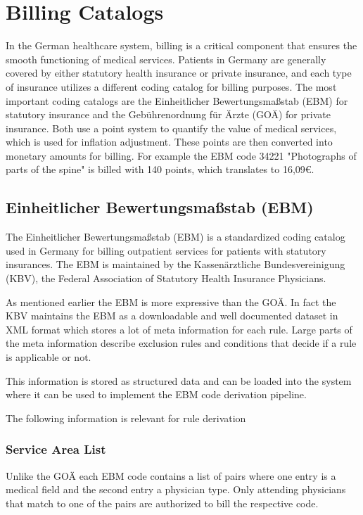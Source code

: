 \section{Billing Catalogs}
In the German healthcare system, billing is a critical component that ensures the smooth functioning of medical services.
Patients in Germany are generally covered by either statutory health insurance or private insurance, and each type of insurance
utilizes a different coding catalog for billing purposes.
The most important coding catalogs are the Einheitlicher Bewertungsmaßstab (EBM) for statutory insurance and the Gebührenordnung für Ärzte (GOÄ) for private insurance.
Both use a point system to quantify the value of medical services, which is used for inflation adjustment.
These points are then converted into monetary amounts for billing.
For example the EBM code 34221 "Photographs of parts of the spine" is billed with 140 points, which translates to 16,09€.



\subsection{Einheitlicher Bewertungsmaßstab (EBM)}
The Einheitlicher Bewertungsmaßstab (EBM) is a standardized coding catalog used in Germany for billing outpatient services for patients with statutory insurances.
The EBM is maintained by the Kassenärztliche Bundesvereinigung (KBV), the Federal Association of Statutory Health Insurance Physicians\cite[]{hermanns2015ebm}.

As mentioned earlier the EBM is more expressive than the GOÄ.
In fact the KBV maintains the EBM as a downloadable and well documented dataset in XML format which stores a lot of meta information for each rule.
Large parts of the meta information describe exclusion rules and conditions that decide if a rule is applicable or not.

This information is stored as structured data and can be loaded into the system where it can be used to implement the EBM code derivation pipeline.

The following information is relevant for rule derivation
\subsubsection{Service Area List}
Unlike the GOÄ each EBM code contains a list of pairs where one entry is a medical field and the second entry a physician type.
Only attending physicians that match to one of the pairs are authorized to bill the respective code.

